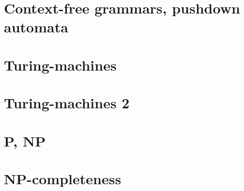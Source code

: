 \documentclass[a4paper]{article}
\begin{document}
\section{Context-free grammars, pushdown automata}
\pagebreak
\pagebreak
\pagebreak
\pagebreak
\pagebreak
\pagebreak
\pagebreak
\pagebreak
\pagebreak
\pagebreak
\pagebreak
\pagebreak

\section{Turing-machines}
\pagebreak
\pagebreak
\pagebreak
\pagebreak
\pagebreak
\pagebreak
\pagebreak
\pagebreak
\pagebreak

\section{Turing-machines 2}
\pagebreak
\pagebreak
\pagebreak
\pagebreak
\pagebreak
\pagebreak
\pagebreak
\pagebreak

\section{P, NP}
\pagebreak
\pagebreak
\pagebreak
\pagebreak
\pagebreak
\pagebreak
\pagebreak
\pagebreak
\pagebreak

\section{NP-completeness}
\pagebreak
\pagebreak
\pagebreak
\pagebreak
\pagebreak
\pagebreak
\pagebreak
\pagebreak
\pagebreak
\pagebreak
\pagebreak
\pagebreak
\pagebreak

\section{}
\section{}
\end{document}
